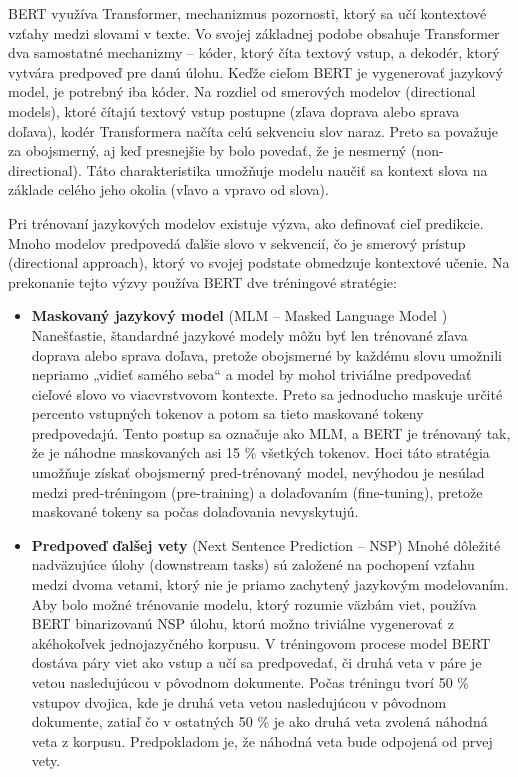 BERT využíva Transformer, mechanizmus pozornosti, ktorý sa učí kontextové vzťahy medzi slovami  v texte. Vo svojej základnej podobe obsahuje Transformer dva samostatné mechanizmy – kóder, ktorý číta textový vstup, a dekodér, ktorý vytvára predpoveď pre danú úlohu. Keďže cieľom BERT je vygenerovať jazykový model, je potrebný iba kóder. Na rozdiel od smerových modelov (directional models), ktoré čítajú textový vstup postupne (zľava doprava alebo sprava doľava), kodér Transformera načíta celú sekvenciu slov naraz. Preto sa považuje za obojsmerný, aj keď presnejšie by bolo povedať, že je nesmerný (non-directional). Táto charakteristika umožňuje modelu naučiť sa kontext slova na základe celého jeho okolia (vľavo a vpravo od slova).

Pri trénovaní jazykových modelov existuje výzva, ako definovať cieľ predikcie. Mnoho modelov predpovedá ďalšie slovo v sekvencií, čo je smerový prístup (directional approach), ktorý vo svojej podstate obmedzuje kontextové učenie. Na prekonanie tejto výzvy používa BERT dve tréningové stratégie:
\begin{itemize}
    \item \textbf{Maskovaný jazykový model}  (MLM -- Masked Language Model )  Nanešťastie, štandardné  jazykové modely môžu byť len trénované zľava doprava alebo sprava doľava, pretože obojsmerné by každému slovu umožnili nepriamo „vidieť samého seba“ a model by mohol triviálne predpovedať cieľové slovo vo viacvrstvovom kontexte. Preto sa jednoducho maskuje určité percento vstupných tokenov a potom sa tieto maskované tokeny predpovedajú. Tento postup sa označuje ako MLM, a BERT je trénovaný tak, že je náhodne maskovaných asi 15 \% všetkých tokenov. Hoci táto stratégia umožňuje získať obojsmerný pred-trénovaný model, nevýhodou je nesúlad medzi pred-tréningom (pre-training) a dolaďovaním (fine-tuning), pretože maskované tokeny sa počas dolaďovania nevyskytujú.
    
    \item \textbf{Predpoveď ďalšej vety} (Next Sentence Prediction -- NSP) Mnohé dôležité nadväzujúce úlohy (downstream tasks) sú založené na pochopení vzťahu medzi dvoma vetami, ktorý nie je priamo zachytený jazykovým modelovaním. Aby bolo možné trénovanie modelu, ktorý rozumie väzbám viet, používa BERT binarizovanú NSP úlohu, ktorú možno triviálne vygenerovať z akéhokoľvek jednojazyčného korpusu. V tréningovom procese model BERT dostáva páry viet ako vstup a učí sa predpovedať, či druhá veta v páre je vetou nasledujúcou v pôvodnom dokumente. Počas tréningu tvorí 50 \% vstupov dvojica, kde je druhá veta vetou nasledujúcou v pôvodnom dokumente, zatiaľ čo v ostatných 50 \% je ako druhá veta zvolená náhodná veta z korpusu. Predpokladom je, že náhodná veta bude odpojená od prvej vety.
\end{itemize}

